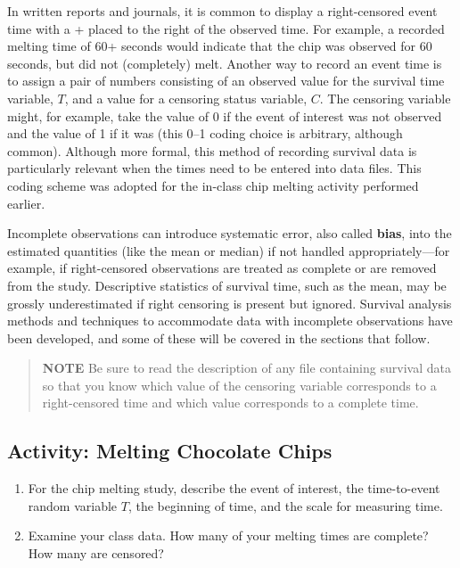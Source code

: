\documentclass[
]{book}
\begin{document}
In written reports and journals, it is common to display a right-censored event time with a + placed to the right of the observed time. For example, a recorded melting time of 60+ seconds would indicate that the chip was observed for 60 seconds, but did not (completely) melt. Another way to record an event time is to assign a pair of numbers consisting of an observed value for the survival time variable, \(T\), and a value for a censoring status variable, \(C\). The censoring variable might, for example, take the value of 0 if the event of interest was not observed and the value of 1 if it was (this 0--1 coding choice is arbitrary, although common). Although more formal, this method of recording survival data is particularly relevant when the times need to be entered into data files. This coding scheme was adopted for the in-class chip melting activity performed earlier.

Incomplete observations can introduce systematic error, also called \textbf{bias}, into the estimated quantities (like the mean or median) if not handled appropriately---for example, if right-censored observations are treated as complete or are removed from the study. Descriptive statistics of survival time, such as the mean, may be grossly underestimated if right censoring is present but ignored. Survival analysis methods and techniques to accommodate data with incomplete observations have been developed, and some of these will be covered in the sections that follow.

\begin{quote}
\textbf{NOTE}
Be sure to read the description of any file containing survival data so that you know which value of the censoring variable corresponds to a right-censored time and which value corresponds to a complete time.
\end{quote}

\hypertarget{activity-melting-chocolate-chips-1}{%
\subsection*{Activity: Melting Chocolate Chips}\label{activity-melting-chocolate-chips-1}}

\begin{enumerate}
\def\labelenumi{\arabic{enumi}.}
\setcounter{enumi}{1}
\item
  For the chip melting study, describe the event of interest, the time-to-event random variable \(T\), the beginning of time, and the scale for measuring time.
\item
  Examine your class data. How many of your melting times are complete? How many are censored?
\end{enumerate}
\end{document}
